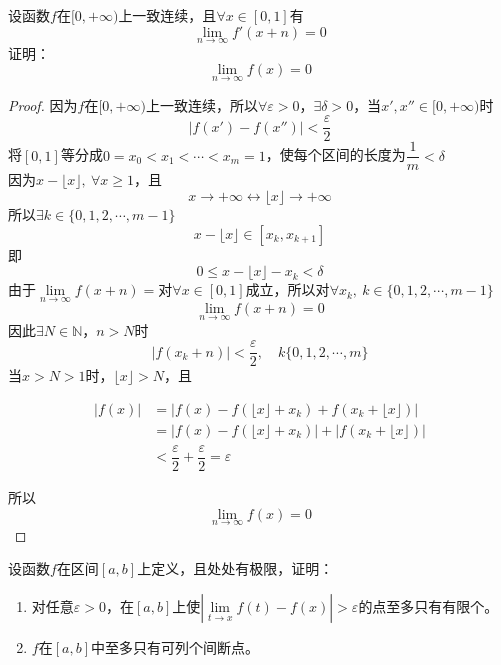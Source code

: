 \begin{proposition}

    设函数$f$在$[0,+\infty)$上一致连续，且$\forall x \in [0,1]$有
    $$\lim_{n\to\infty}{f'(x+n)} = 0$$
    证明：
    $$\lim_{n\to\infty}{f(x)} = 0$$

\end{proposition}

\begin{proof}

    因为$f$在$[0,+\infty)$上一致连续，所以$\forall \varepsilon > 0$，$\exists \delta > 0$，当$x', x'' \in [0,+\infty)$时
    $$|f(x') - f(x'')| < \dfrac{\varepsilon}{2}$$
    将$[0,1]$等分成$0 = x_0 < x_1 < \cdots < x_m = 1$，使每个区间的长度为$\dfrac{1}{m} < \delta$\\
    因为$x - \lfloor x \rfloor,\ \forall x \geq 1$，且
    $$x\to+\infty \leftrightarrow \lfloor x \rfloor \to +\infty$$
    所以$\exists k \in \{0,1,2,\cdots , m-1\}$
    $$x - \lfloor x \rfloor \in [x_k, x_{k+1}]$$
    即
    $$0 \leq x - \lfloor x \rfloor - x_k < \delta$$
    由于$\lim\limits_{n\to\infty}{f(x+n)} = $对$\forall x \in [0,1]$成立，所以对$\forall x_k,\ k \in \{0,1,2,\cdots , m-1\}$
    $$\lim_{n\to\infty}{f(x+n)} = 0$$
    因此$\exists N \in \mathbb{N}$，$n >N$时
    $$|f(x_k + n)| < \dfrac{\varepsilon}{2}, \quad k \{0,1,2,\cdots , m\}$$
    当$x > N > 1$时，$\lfloor x \rfloor > N$，且

    \begin{align*}
        |f(x)| & = |f(x) - f(\lfloor x \rfloor + x_k) + f(x_k + \lfloor x \rfloor)| \\
        & = |f(x) - f(\lfloor x \rfloor + x_k)| + |f(x_k + \lfloor x \rfloor)| \\
        & < \dfrac{\varepsilon}{2} + \dfrac{\varepsilon}{2} = \varepsilon
    \end{align*}

    所以
    $$\lim_{n\to\infty}{f(x)} = 0$$

\end{proof}


\begin{proposition}
    
    设函数$f$在区间$[a,b]$上定义，且处处有极限，证明：

    \begin{enumerate}

        \item 对任意$\varepsilon > 0$，在$[a,b]$上使$\left| \lim\limits_{t \to x}{f(t) - f(x)} \right| > \varepsilon$的点至多只有有限个。
        
        \item $f$在$[a,b]$中至多只有可列个间断点。
        
    \end{enumerate}

\end{proposition}


